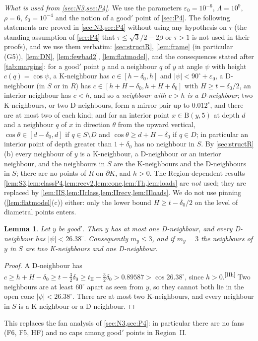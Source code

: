 \documentclass[11pt]{amsart}
\newtheorem{lemma}[theorem]{Lemma}
\theoremstyle{definition}
\theoremstyle{remark}
\newcommand{\eps}{\varepsilon}
\newcommand{\Dd}{\mathrm{B}}      %
\newcommand{\chk}[1]{\textsuperscript{[#1]}}
\begin{document}
\emph{What is used from \cref{sec:N3,sec:P4}.} We use the parameters $\eps_0=10^{-6}$, $\Lambda=10^9$, $\rho=6$, $\delta_0=10^{-4}$ and the notion of a good$'$ point of \cref{sec:P4}. The following statements are proved in \cref{sec:N3,sec:P4} without using any hypothesis on $\tau$ (the standing assumption of \cref{sec:P4} that $\tau\le\sqrt3/2-2\beta$ or $\tau>1$ is not used in their proofs), and we use them verbatim: \cref{sec:structR}, \cref{lem:frame} (in particular (G5)), \cref{lem:DN}, \cref{lem:fewbad2}, \cref{lem:flatmodel}, and the consequences stated after \cref{tab:margins}: for a good$'$ point $y$ and a neighbour $q$ of $y$ at angle $\psi$ with height $c(q)=\cos\psi$, a K-neighbour has $c\in[h-\delta_0,h]$ and $|\psi|<90^\circ+\eps_0$, a D-neighbour (in $S$ or in $R$) has $c\in[h+H-\delta_0,h+H+\delta_0]$ with $H\ge t-\delta_0/2$, an interior neighbour has $c<h$, and so \emph{a neighbour with $c>h$ is a D-neighbour}; two K-neighbours, or two D-neighbours, form a mirror pair up to $0.012^\circ$, and there are at most two of each kind; and for an interior point $x\in\Dd(y,5)$ at depth $d$ and a neighbour $q$ of $x$ in direction $\theta$ from the upward vertical, $\cos\theta\in[d-\delta_0,d]$ if $q\in S\setminus D$ and $\cos\theta\ge d+H-\delta_0$ if $q\in D$; in particular an interior point of depth greater than $1+\delta_0$ has no neighbour in $S$. By \cref{sec:structR}(b) every neighbour of $y$ is a K-neighbour, a D-neighbour or an interior neighbour, and the neighbours in $S$ are the K-neighbours and the D-neighbours in $S$; there are no points of $R$ on $\partial K$, and $h>0$. The Region-dependent results \cref{lem:S3,lem:classP4,lem:recv2,lem:cone,lem:Th,lem:loads} are \emph{not} used; they are replaced by \cref{lem:IIS,lem:IIclass,lem:IIrecv,lem:IIloads}. We do not use pinning (\cref{lem:flatmodel}(c)) either: only the lower bound $H\ge t-\delta_0/2$ on the level of diametral points enters.

\begin{lemma}\label{lem:IIS}
Let $y$ be good$'$. Then $y$ has at most one D-neighbour, and every D-neighbour has $|\psi|<26.38^\circ$. Consequently $m_y\le3$, and if $m_y=3$ the neighbours of $y$ in $S$ are two K-neighbours and one D-neighbour.
\end{lemma}
\begin{proof}
A D-neighbour has $c\ge h+H-\delta_0\ge t-\frac32\delta_0\ge t_{\mathrm{II}}-\frac32\delta_0>0.89587>\cos26.38^\circ$, since $h>0$.\chk{IIh} Two neighbours are at least $60^\circ$ apart as seen from $y$, so they cannot both lie in the open cone $|\psi|<26.38^\circ$. There are at most two K-neighbours, and every neighbour in $S$ is a K-neighbour or a D-neighbour.
\end{proof}
This replaces the fan analysis of \cref{sec:N3,sec:P4}: in particular there are no fans (F6, F5, HF) and no caps among good$'$ points in Region~II.
\end{document}
